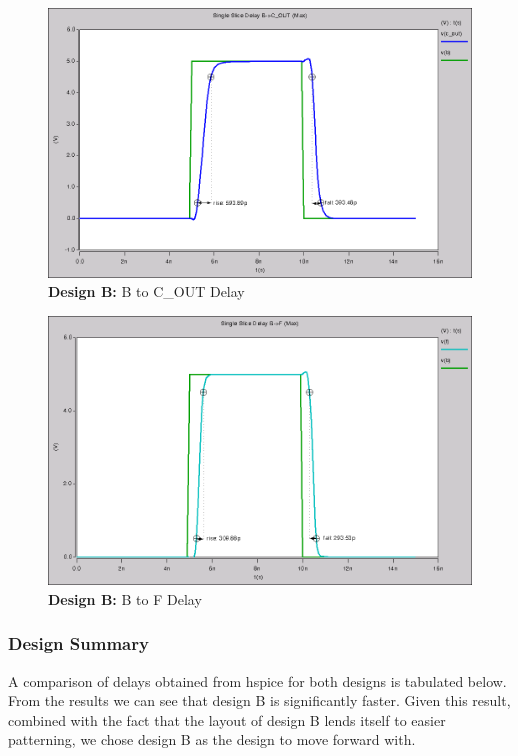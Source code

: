 \documentclass{article}
\begin{document}
\begin{figure}[H]
    \centering
    \includegraphics[width=\linewidth]{../part_3/max/max_single_slice_b_to_cout.png}
    \caption{\textbf{Design B:} B to C\_OUT Delay}
\end{figure}

\begin{figure}[H]
    \centering
    \includegraphics[width=\linewidth]{../part_3/max/max_single_slice_b_to_f.png}
    \caption{\textbf{Design B:} B to F Delay}
\end{figure}

\vspace{0.5in}
\subsubsection*{Design Summary}

A comparison of delays obtained from hspice for both designs is tabulated
below. From the results we can see that design B is significantly faster. Given
this result, combined with the fact that the layout of design B lends itself to
easier patterning, we chose design B as the design to move forward with.
\end{document}
